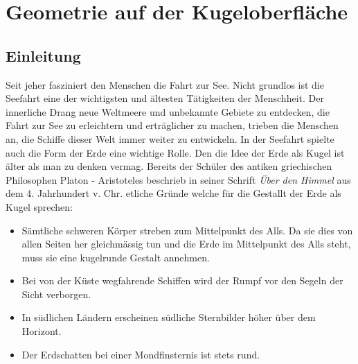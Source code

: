 \chapter{Geometrie auf der Kugeloberfläche\label{chapter:kugel}}
\begin{refsection}

\section{Einleitung}
Seit jeher fasziniert den Menschen die Fahrt zur See. Nicht grundlos ist die Seefahrt eine der wichtigsten und ältesten Tätigkeiten der Menschheit. Der innerliche Drang neue Weltmeere und unbekannte Gebiete zu entdecken, die Fahrt zur See zu erleichtern und erträglicher zu machen, trieben die Menschen an, die Schiffe dieser Welt immer weiter zu entwickeln.
In der Seefahrt spielte auch die Form der Erde eine wichtige Rolle. Den die Idee der Erde als Kugel ist älter als man zu denken vermag. Bereits der Schüler des antiken griechischen Philosophen Platon - Aristoteles beschrieb in seiner Schrift \textit{Über den Himmel} aus dem 4. Jahrhundert v. Chr. etliche Gründe welche für die Gestallt der Erde als Kugel sprechen:
\begin{itemize}
      \item Sämtliche schweren Körper streben zum Mittelpunkt des Alls. Da sie dies von allen Seiten her gleichmässig tun und die Erde im Mittelpunkt des Alls steht, muss sie eine kugelrunde Gestalt annehmen. 
\item Bei von der Küste wegfahrende Schiffen wird der Rumpf vor den Segeln der Sicht verborgen. 
\item In südlichen Ländern erscheinen südliche Sternbilder höher über dem Horizont.
\item Der Erdschatten bei einer Mondfinsternis ist stets rund.
\end{itemize}


\end{refsection}
